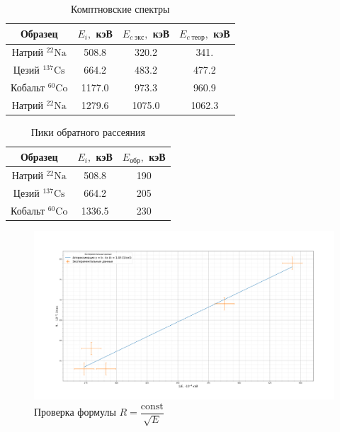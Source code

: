 \documentclass[a4paper,12pt]{article} %
\begin{document}
	\begin{table}[H]
		\caption{Комптновские спектры}
		\begin{center}
			\begin{tabular}{|c|c|c|c|}
				\hline 
				Образец & $ E_i, $ кэВ  & $ E_{c\; экс}, $ кэВ  & $ E_{c \; теор}, $ кэВ \\
				\hline 
				Натрий $ \mathrm{^{22}Na} $ & 508.8 & 320.2 & 341. \\
				Цезий $ \mathrm{^{137}Cs} $ & 664.2 & 483.2 & 477.2 \\
				Кобальт $ \mathrm{^{60}Co} $ & 1177.0 & 973.3 & 960.9 \\
				Натрий $ \mathrm{^{22}Na} $& 1279.6 & 1075.0 & 1062.3 \\
				\hline 
			\end{tabular} 
		\end{center}
		\label{compt}
	\end{table}
	
	\begin{table}[H]
		\caption{Пики обратного рассеяния}
		\begin{center}
			\begin{tabular}{|c|c|c|}
				\hline 
				Образец & $ E_i, $ кэВ  & $ E_{обр}, $ кэВ  \\
				\hline 
				Натрий $ \mathrm{^{22}Na} $  & 508.8 & 190 \\
				Цезий $ \mathrm{^{137}Cs} $ & 664.2 & 205 \\
				Кобальт $ \mathrm{^{60}Co} $ & 1336.5 & 230 \\
				\hline 
			\end{tabular} 
		\end{center}
		\label{obr}
	\end{table}
	\begin{figure}[H]
		\centering
		\includegraphics[width=0.95\linewidth]{R}
		\caption{Проверка формулы $ R = \dfrac{\mathrm{const}}{\sqrt{E}} $}
		\label{fig:r}
	\end{figure}
\end{document}
